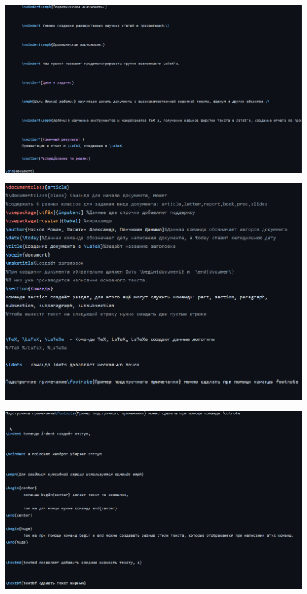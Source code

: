 \documentclass{article}
\begin{document}
	
	\includegraphics[width=\linewidth]{2}
	
	
	\includegraphics[width=\linewidth]{3}
	
	
	\includegraphics[width=\linewidth]{4}
	
\end{document}
